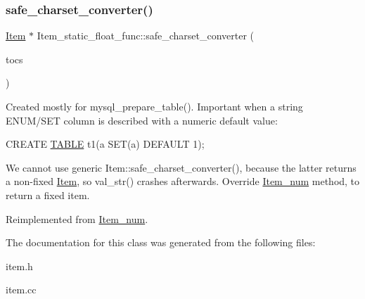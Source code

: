 \subsubsection{\texorpdfstring{safe\+\_\+charset\+\_\+converter()}{safe\_charset\_converter()}}
{\footnotesize\ttfamily \mbox{\hyperlink{classItem}{Item}} $\ast$ Item\+\_\+static\+\_\+float\+\_\+func\+::safe\+\_\+charset\+\_\+converter (\begin{DoxyParamCaption}\item[{const C\+H\+A\+R\+S\+E\+T\+\_\+\+I\+N\+FO $\ast$}]{tocs }\end{DoxyParamCaption})\hspace{0.3cm}{\ttfamily [virtual]}}

Created mostly for mysql\+\_\+prepare\+\_\+table(). Important when a string E\+N\+U\+M/\+S\+ET column is described with a numeric default value\+:

C\+R\+E\+A\+TE \mbox{\hyperlink{structTABLE}{T\+A\+B\+LE}} t1(a S\+ET(\textquotesingle{}a\textquotesingle{}) D\+E\+F\+A\+U\+LT 1);

We cannot use generic Item\+::safe\+\_\+charset\+\_\+converter(), because the latter returns a non-\/fixed \mbox{\hyperlink{classItem}{Item}}, so val\+\_\+str() crashes afterwards. Override \mbox{\hyperlink{classItem__num}{Item\+\_\+num}} method, to return a fixed item. 

Reimplemented from \mbox{\hyperlink{classItem__num_a2185b5b16fe2ec007c127b1c3567b233}{Item\+\_\+num}}.



The documentation for this class was generated from the following files\+:\begin{DoxyCompactItemize}
\item 
item.\+h\item 
item.\+cc\end{DoxyCompactItemize}
